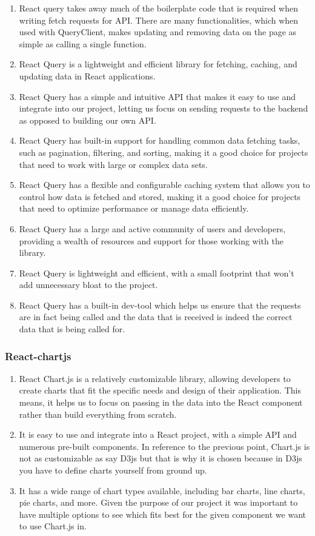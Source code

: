 \documentclass[singlespacing,12pt,parskip,headsepline,consistentlayout]{article}
\begin{document}
\begin{enumerate}
    \item React query takes away much of the boilerplate code that is required when writing fetch requests for API. There are many functionalities, which when used with QueryClient, makes updating and removing data on the page as simple as calling a single function.
    \item React Query is a lightweight and efficient library for fetching, caching, and updating data in React applications. \cite{tanstackQueryDocs}
    \item React Query has a simple and intuitive API that makes it easy to use and integrate into our project, letting us focus on sending requests to the backend as opposed to building our own API.
    \item React Query has built-in support for handling common data fetching tasks, such as pagination, filtering, and sorting, making it a good choice for projects that need to work with large or complex data sets.
    \item React Query has a flexible and configurable caching system that allows you to control how data is fetched and stored, making it a good choice for projects that need to optimize performance or manage data efficiently.
    \item React Query has a large and active community of users and developers, providing a wealth of resources and support for those working with the library.
    \item React Query is lightweight and efficient, with a small footprint that won't add unnecessary bloat to the project.
    \item React Query has a built-in dev-tool which helps us ensure that the requests are in fact being called and the data that is received is indeed the correct data that is being called for.
\end{enumerate}

\subsubsection{React-chartjs}
\begin{enumerate}
    \item React Chart.js is a relatively customizable library, allowing developers to create charts that fit the specific needs and design of their application. This means, it helps us to focus on passing in the data into the React component rather than build everything from scratch.
    \item It is easy to use and integrate into a React project, with a simple API and numerous pre-built components. In reference to the previous point, Chart.js is not as customizable as say D3js but that is why it is chosen because in D3js you have to define charts yourself from ground up.
    \item It has a wide range of chart types available, including bar charts, line charts, pie charts, and more. \cite{chartjs} Given the purpose of our project it was important to have multiple options to see which fits best for the given component we want to use Chart.js in.
\end{enumerate}
\end{document}
